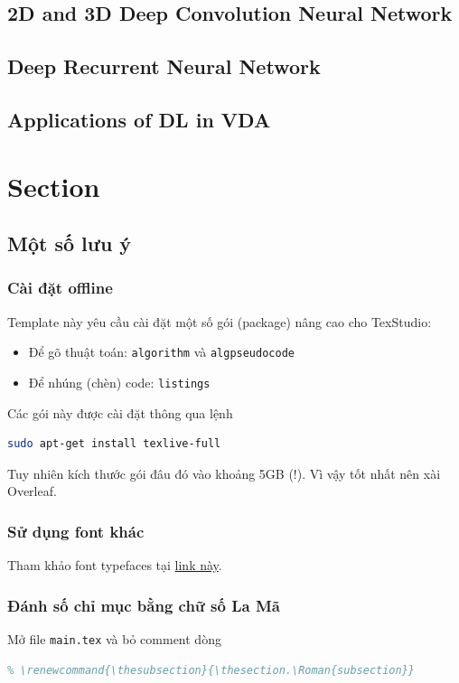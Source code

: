 \subsection{2D and 3D Deep Convolution Neural Network}
\subsection{Deep Recurrent Neural Network}
\subsection{Applications of DL in VDA}

% 











\section{Section}

\subsection{Một số lưu ý}

\subsubsection{Cài đặt offline}
Template này yêu cầu cài đặt một số gói (package) nâng cao cho TexStudio:
\begin{itemize}
\item Để gõ thuật toán: \texttt{algorithm} và \texttt{algpseudocode}
\item Để nhúng (chèn) code: \texttt{listings}
\end{itemize}
Các gói này được cài đặt thông qua lệnh
\begin{lstlisting}[language=sh]
sudo apt-get install texlive-full
\end{lstlisting}
Tuy nhiên kích thước gói đâu đó vào khoảng 5GB (!). Vì vậy tốt nhất nên xài Overleaf.

\subsubsection{Sử dụng font khác}
Tham khảo font typefaces tại \href{https://www.overleaf.com/learn/latex/Font_typefaces}{link này}.

\subsubsection{Đánh số chỉ mục bằng chữ số La Mã}
Mở file \texttt{main.tex} và bỏ comment dòng 
\begin{lstlisting}[language=tex]
% \renewcommand{\thesection}{\Roman{section}}
% \renewcommand{\thesubsection}{\thesection.\Roman{subsection}}  
\end{lstlisting}

